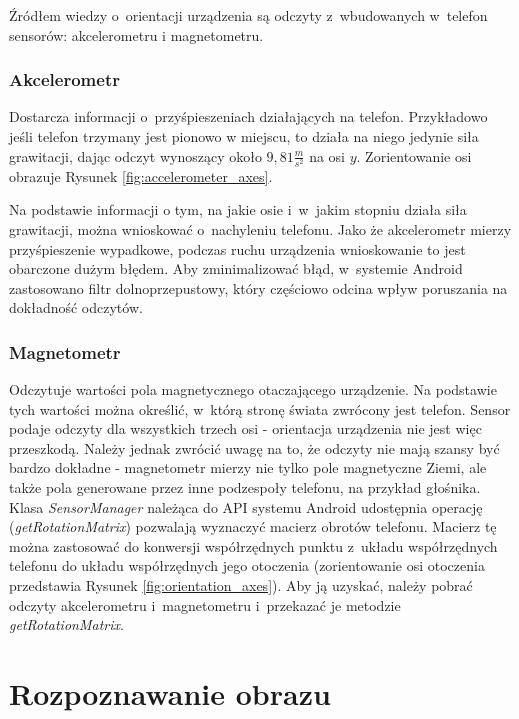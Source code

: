 \documentclass[a4paper,twocolumn,11pt]{article}
\begin{document}
Źródłem wiedzy o~orientacji urządzenia są odczyty z~wbudowanych w~telefon sensorów: akcelerometru i magnetometru.

\subsubsection{Akcelerometr}
 Dostarcza informacji o~przyśpieszeniach działających na telefon.
 Przykładowo jeśli telefon trzymany jest pionowo w miejscu, to działa na niego jedynie siła grawitacji, dając odczyt wynoszący około $9,81\frac{m}{s^2}$ na osi $y$.
 Zorientowanie osi obrazuje Rysunek \ref{fig:accelerometer_axes}.
 
% 

 Na podstawie informacji o tym, na jakie osie i~w~jakim stopniu działa siła grawitacji, można wnioskować o~nachyleniu telefonu.
 Jako że akcelerometr mierzy przyśpieszenie wypadkowe, podczas ruchu urządzenia wnioskowanie to jest obarczone dużym błędem.
 Aby zminimalizować błąd, w~systemie Android zastosowano filtr dolnoprzepustowy, który częściowo odcina wpływ poruszania na dokładność odczytów.

\subsubsection{Magnetometr}
 Odczytuje wartości pola magnetycznego otaczającego urządzenie.
 Na podstawie tych wartości można określić, w~którą stronę świata zwrócony jest telefon.
 Sensor podaje odczyty dla wszystkich trzech osi - orientacja urządzenia nie jest więc przeszkodą.
 Należy jednak zwrócić uwagę na to, że odczyty nie mają szansy być bardzo dokładne - magnetometr mierzy nie tylko pole magnetyczne Ziemi, ale także pola generowane przez inne podzespoły telefonu, na przykład głośnika.\\

 Klasa \emph{SensorManager} należąca do API systemu Android udostępnia operację (\emph{getRotationMatrix}) pozwalają wyznaczyć macierz obrotów telefonu.
 Macierz tę można zastosować do konwersji współrzędnych punktu z~układu współrzędnych telefonu do układu współrzędnych jego otoczenia (zorientowanie osi otoczenia przedstawia Rysunek \ref{fig:orientation_axes}).
 Aby ją uzyskać, należy pobrać odczyty akcelerometru i~magnetometru i~przekazać je metodzie \emph{getRotationMatrix}.

% 



\section{Rozpoznawanie obrazu}
\end{document}
